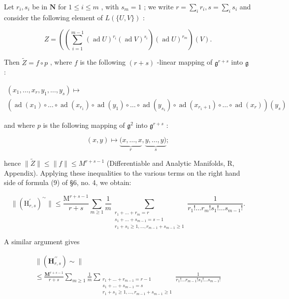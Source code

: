 Let \(r_i, s_i\) be in \(\mathbf{N}\) for \(1 \leqslant i \leqslant m\) , with \(s_m = 1\) ; we write \(r = \sum_{i} r_i, s = \sum_{i} s_i\) and consider the following element of \(L(\{U, V\})\) :

\[
Z = \left(\left(\sum_ {i = 1} ^ {m - 1} (\operatorname{ad} U) ^ {r _ {i}} (\operatorname{ad} V) ^ {s _ {i}}\right) (\operatorname{ad} U) ^ {r _ {m}}\right) (V).
\]

Then \(\tilde{Z} = f \circ p\) , where \(f\) is the following \((r + s)\) -linear mapping of \(\mathfrak{g}^{r + s}\) into \(\mathfrak{g}\) :

\[
\begin{array}{l} \left(x _ {1}, \dots , x _ {r}, y _ {1}, \dots , y _ {s}\right) \mapsto \\ \left(\operatorname{ad} \left(x _ {1}\right) \circ \dots \circ \operatorname{ad} \left(x _ {r _ {1}}\right) \circ \operatorname{ad} \left(y _ {1}\right) \circ \dots \circ \operatorname{ad} \left(y _ {s _ {1}}\right) \circ \operatorname{ad} \left(x _ {r _ {1} + 1}\right) \circ \dots \circ \operatorname{ad} \left(x _ {r}\right)\right) \left(y _ {s}\right) \end{array}
\]

and where \(p\) is the following mapping of \(\mathfrak{g}^2\) into \(\mathfrak{g}^{r+s}\) :

\[
(x, y) \mapsto \underbrace {(x , \dots , x} _ {r}, \underbrace {y , \dots , y)} _ {s};
\]

hence \(\| \tilde{Z}\| \leqslant \| f\| \leqslant M^{r + s - 1}\) (Differentiable and Analytic Manifolds, R, Appendix). Applying these inequalities to the various terms on the right hand side of formula (9) of §6, no. 4, we obtain:

\[
\| (\mathrm{H} _ {r, s} ^ {\prime}) ^ {\sim} \| \leqslant \frac {\mathrm{M} ^ {r + s - 1}}{r + s} \sum_ {m \geqslant 1} \frac {1}{m} \sum_ {\substack {r _ {1} + \dots + r _ {m} = r \\ s _ {1} + \dots + s _ {m - 1} = s - 1 \\ r _ {1} + s _ {1} \geqslant 1, \dots , r _ {m - 1} + s _ {m - 1} \geqslant 1}} \frac {1}{r _ {1} ! \dots r _ {m} ! s _ {1} ! \dots s _ {m - 1} !}.\tag{10}
\]

A similar argument gives

\[
\begin{array}{l}\| (\mathbf{H}_{r,s}^{\prime \prime})\sim \| \\ \leqslant \frac{\mathbf{M}^{r + s - 1}}{r + s}\sum_{m\geqslant 1}\frac{1}{m}\sum_{\substack{r_{1} + \dots +r_{m - 1} = r - 1\\ s_{1} + \dots +s_{m - 1} = s\\ r_{1} + s_{1}\geqslant 1,\ldots ,r_{m - 1} + s_{m - 1}\geqslant 1}}\frac{1}{r_{1}!\ldots r_{m - 1}!s_{1}!\ldots s_{m - 1}!} \end{array}\tag{11}
\]

